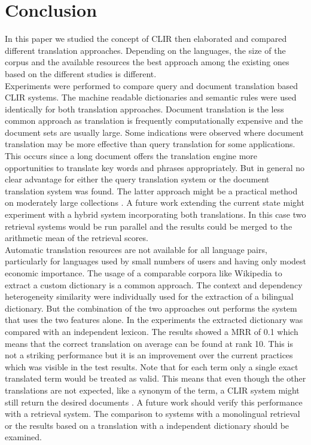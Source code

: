 \documentclass[journal]{IEEEtran}
\begin{document}
\section{Conclusion}
In this paper we studied the concept of CLIR then elaborated and compared different translation approaches.
Depending on the languages, the size of the corpus and the available resources the best approach among the existing ones based on the different studies is different.
\mbox{}\\

Experiments were performed to compare query and document translation based CLIR systems.
The machine readable dictionaries and semantic rules were used identically for both translation approaches.
Document translation is the less common approach as translation is frequently computationally expensive and the document sets are usually large.
Some indications were observed where document translation may be more effective than query translation for some applications.
This occurs since a long document offers the translation engine more opportunities to translate key words and phrases appropriately.
But in general no clear advantage for either the query translation system or the document translation system was found.
The latter approach might be a practical method on moderately large collections \cite{oard97b}.
A future work extending the current state might experiment with a hybrid system incorporating both translations.
In this case two retrieval systems would be run parallel and the results could be merged to the arithmetic mean of the retrieval scores.
\mbox{}\\

Automatic translation resources are not available for all language pairs, particularly for languages used by small numbers of users and having only modest economic importance.
The usage of a comparable corpora like Wikipedia to extract a custom dictionary is a common approach.
The context and dependency heterogeneity similarity were individually used for the extraction of a bilingual dictionary.
But the combination of the two approaches out performs the system that uses the two features alone.
In the experiments the extracted dictionary was compared with an independent lexicon.
The results showed a MRR of 0.1 which means that the correct translation on average can be found at rank 10.
This is not a striking performance but it is an improvement over the current practices which was visible in the test results.
Note that for each term only a single exact translated term would be treated as valid.
This means that even though the other translations are not expected, like a synonym of the term, a CLIR system might still return the desired documents \cite{yu09}.
A future work should verify this performance with a retrieval system.
The comparison to systems with a monolingual retrieval or the results based on a translation with a independent dictionary should be examined.
\mbox{}\\
\end{document}
